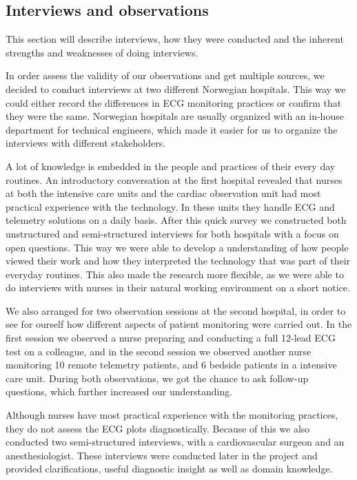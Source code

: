 \subsection{Interviews and observations} %
\label{sub:interviews}

This section will describe interviews, how they were conducted and the inherent strengths and weaknesses of doing interviews.

In order assess the validity of our observations and get multiple sources, we decided to conduct interviews at two different Norwegian hospitals. This way we could either record the differences in ECG monitoring practices or confirm that they were the same. Norwegian hospitals are usually organized with an in-house department for technical engineers, which made it easier for us to organize the interviews with different stakeholders.

A lot of knowledge is embedded in the people and practices of their every day routines. An introductory conversation at the first hospital revealed that nurses at both the intensive care units and the cardiac observation unit had most practical experience with the technology. In these units they handle ECG and telemetry solutions on a daily basis. After this quick survey we constructed both unstructured and semi-structured interviews for both hospitals with a focus on open questions. This way we were able to develop a understanding of how people viewed their work and how they interpreted the technology that was part of their everyday routines. This also made the research more flexible, as we were able to do interviews with nurses in their natural working environment on a short notice.

We also arranged for two observation sessions at the second hospital, in order to see for ourself how different aspects of patient monitoring were carried out. In the first session we observed a nurse preparing and conducting a full 12-lead ECG test on a colleague, and in the second session we observed another nurse monitoring 10 remote telemetry patients, and 6 bedside patients in a intensive care unit. During both observations, we got the chance to ask follow-up questions, which further increased our understanding.

Although nurses have most practical experience with the monitoring practices, they do not assess the ECG plots diagnostically. Because of this we also conducted two semi-structured interviews, with a cardiovascular surgeon and an anesthesiologist. These interviews were conducted later in the project and provided clarifications, useful diagnostic insight as well as domain knowledge.

